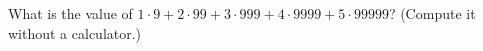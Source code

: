 What is the value of $1\cdot9+2\cdot99+3\cdot999+4\cdot9999+5\cdot99999$? (Compute it without a calculator.)
